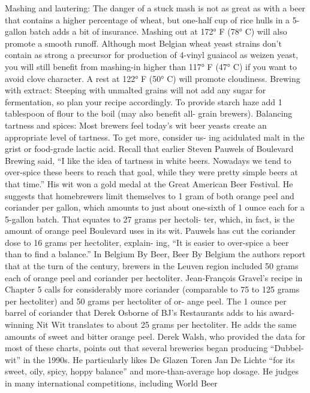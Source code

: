 \documentclass[a4paper,parskip=half]{scrartcl}
\begin{document}
\parencite[183\psqq]{Hieronymus2010}
Mashing and lautering: The danger of a stuck mash is not as great
as with a beer that contains a higher percentage of wheat, but one-half
cup of rice hulls in a 5-gallon batch adds a bit of insurance. Mashing
out at 172° F (78° C) will also promote a smooth runoff. Although
most Belgian wheat yeast strains don’t contain as strong a precursor
for production of 4-vinyl guaiacol as weizen yeast, you will still benefit
from mashing-in higher than 117° F (47° C) if you want to avoid clove
character. A rest at 122° F (50° C) will promote cloudiness.
Brewing with extract: Steeping with unmalted grains will not add
any sugar for fermentation, so plan your recipe accordingly. To provide
starch haze add 1 tablespoon of flour to the boil (may also benefit all-
grain brewers).
Balancing tartness and spices: Most brewers feel today’s wit beer
yeasts create an appropriate level of tartness. To get more, consider us-
ing acidulated malt in the grist or food-grade lactic acid.
Recall that earlier Steven Pauwels of Boulevard Brewing said, “I like
the idea of tartness in white beers. Nowadays we tend to over-spice
these beers to reach that goal, while they were pretty simple beers at that
time.” His wit won a gold medal at the Great American Beer Festival. He
suggests that homebrewers limit themselves to 1 gram of both orange
peel and coriander per gallon, which amounts to just about one-sixth of
1 ounce each for a 5-gallon batch. That equates to 27 grams per hectoli-
ter, which, in fact, is the amount of orange peel Boulevard uses in its wit.
Pauwels has cut the coriander dose to 16 grams per hectoliter, explain-
ing, “It is easier to over-spice a beer than to find a balance.”
In Belgium By Beer, Beer By Belgium the authors report that at
the turn of the century, brewers in the Leuven region included 50 grams
each of orange peel and coriander per hectoliter. Jean-François Gravel’s
recipe in Chapter 5 calls for considerably more coriander (comparable
to 75 to 125 grams per hectoliter) and 50 grams per hectoliter of or-
ange peel. The 1 ounce per barrel of coriander that Derek Osborne of
BJ’s Restaurants adds to his award-winning Nit Wit translates to about
25 grams per hectoliter. He adds the same amounts of sweet and bitter
orange peel.
Derek Walsh, who provided the data for most of these charts,
points out that several breweries began producing “Dubbel-wit” in the
1990s. He particularly likes De Glazen Toren Jan De Lichte “for its
sweet, oily, spicy, hoppy balance” and more-than-average hop dosage.
He judges in many international competitions, including World Beer
\end{document}
